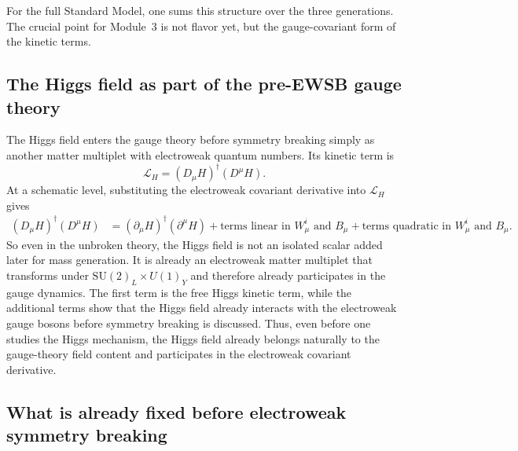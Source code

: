 \documentclass[11pt,a4paper]{article}
\newcommand{\Lag}{\mathcal{L}}
\newcommand{\p}{\partial}
\newcommand{\SUw}{\mathrm{SU}(2)_L}
\begin{document}
For the full Standard Model, one sums this structure over the three generations. The crucial point for Module~3 is not flavor yet, but the gauge-covariant form of the kinetic terms.



\subsection{The Higgs field as part of the pre-EWSB gauge theory}

The Higgs field enters the gauge theory before symmetry breaking simply as another matter multiplet with electroweak quantum numbers. Its kinetic term is
\begin{equation}
\Lag_H=(D_\mu H)^\dagger(D^\mu H).
\label{eq:Higgs-kinetic-expanded}
\end{equation}
At a schematic level, substituting the electroweak covariant derivative into \(\Lag_H\) gives
\begin{align}
	(D_\mu H)^\dagger(D^\mu H)
	&=
	(\p_\mu H)^\dagger(\p^\mu H)
	+ \text{terms linear in } W_\mu^i \text{ and } B_\mu
	+ \text{terms quadratic in } W_\mu^i \text{ and } B_\mu .
	\label{eq:Higgs-kinetic-schematic-expansion}
\end{align}
So even in the unbroken theory, the Higgs field is not an isolated scalar added later for mass generation. It is already an electroweak matter multiplet that transforms under \(\SUw\times U(1)_Y\) and therefore already participates in the gauge dynamics. 
The first term is the free Higgs kinetic term, while the additional terms show that the Higgs field already interacts with the electroweak gauge bosons before symmetry breaking is discussed. 
Thus, even before one studies the Higgs mechanism, the Higgs field already belongs naturally to the gauge-theory field content and participates in the electroweak covariant derivative.



\subsection{What is already fixed before electroweak symmetry breaking}
\end{document}
